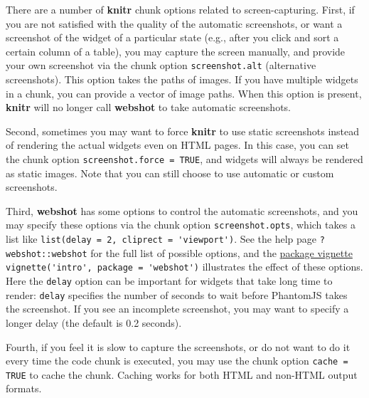 \documentclass[doctor,openright,twoside]{sjtuthesis}
\newcommand{\passthrough}[1]{#1}
\theoremstyle{plain}
\theoremstyle{definition}
\theoremstyle{remark}
\theoremstyle{ocrenumbox}
\theoremstyle{plain}
\begin{document}
There are a number of \textbf{knitr} chunk options related to
screen-capturing. First, if you are not satisfied with the quality of
the automatic screenshots, or want a screenshot of the widget of a
particular state (e.g., after you click and sort a certain column of a
table), you may capture the screen manually, and provide your own
screenshot via the chunk option \passthrough{\lstinline!screenshot.alt!}
(alternative screenshots). This option takes the paths of images. If you
have multiple widgets in a chunk, you can provide a vector of image
paths. When this option is present, \textbf{knitr} will no longer call
\textbf{webshot} to take automatic screenshots.

Second, sometimes you may want to force \textbf{knitr} to use static
screenshots instead of rendering the actual widgets even on HTML pages.
In this case, you can set the chunk option
\passthrough{\lstinline!screenshot.force = TRUE!}, and widgets will
always be rendered as static images. Note that you can still choose to
use automatic or custom screenshots.

Third, \textbf{webshot} has some options to control the automatic
screenshots, and you may specify these options via the chunk option
\passthrough{\lstinline!screenshot.opts!}, which takes a list like
\passthrough{\lstinline!list(delay = 2, cliprect = 'viewport')!}. See
the help page \passthrough{\lstinline!?webshot::webshot!} for the full
list of possible options, and the
\href{https://cran.rstudio.com/web/packages/webshot/vignettes/intro.html}{package
vignette}
\passthrough{\lstinline!vignette('intro', package = 'webshot')!}
illustrates the effect of these options. Here the
\passthrough{\lstinline!delay!} option can be important for widgets that
take long time to render: \passthrough{\lstinline!delay!} specifies the
number of seconds to wait before PhantomJS takes the screenshot. If you
see an incomplete screenshot, you may want to specify a longer delay
(the default is 0.2 seconds).

Fourth, if you feel it is slow to capture the screenshots, or do not
want to do it every time the code chunk is executed, you may use the
chunk option \passthrough{\lstinline!cache = TRUE!} to cache the chunk.
Caching works for both HTML and non-HTML output formats.
\end{document}
